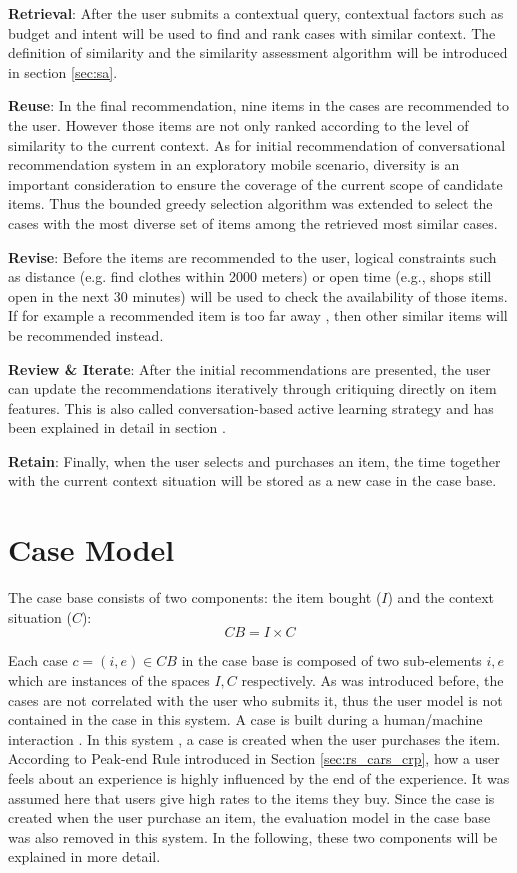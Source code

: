 \textbf{Retrieval}: After the user submits a contextual query, contextual factors such as budget and intent will be used to find and rank cases with similar context. The definition of similarity and the similarity assessment algorithm will be introduced in section \ref{sec:sa}. 

\textbf{Reuse}: In the final recommendation, nine items in the cases are recommended to the user. However those items are not only ranked according to the level of similarity to the current context. As for initial recommendation of conversational recommendation system in an exploratory mobile scenario, diversity is an important consideration to ensure the coverage of the current scope of candidate items. Thus the bounded greedy selection algorithm was extended to select the cases with the most diverse set of items among the retrieved most similar cases. 

\textbf{Revise}: Before the items are recommended to the user, logical constraints such as distance (e.g. find clothes within 2000 meters) or open time (e.g., shops still open in the next 30 minutes) will be used to check the availability of those items. If for example a recommended item is too far away , then other similar items will be recommended instead.

\textbf{Review \& Iterate}: After the initial recommendations are presented, the user can update the recommendations iteratively through critiquing directly on item features. This is also called conversation-based active learning strategy and has been explained in detail in section \cite{sec:rs_alrs}.

\textbf{Retain}: Finally, when the user selects and purchases an item, the time together with the current context situation will be stored as a new case in the case base.

\section{Case Model} \label{sec:cm}

The case base consists of two components: the item bought ($I$) and the context situation ($C$): 
\begin{equation} \label{eq:caseMode}
CB = I \times C
\end{equation}

Each case $c=(i,e) \in CB$ in the case base is composed of two sub-elements $i,e$ which are instances of the spaces $I,C$ respectively. As was introduced before, the cases are not correlated with the user who submits it, thus the user model is not contained in the case in this system. A case is built during a human/machine interaction \cite{ref:26}. In this system , a case is created when the user purchases the item. According to Peak-end Rule introduced in Section \ref{sec:rs_cars_crp}, how a user feels about an experience is highly influenced by the end of the experience. It was assumed here that users give high rates to the items they buy. Since the case is created when the user purchase an item, the evaluation model in the case base was also removed in this system. In the following, these two components will be explained in more detail. 

